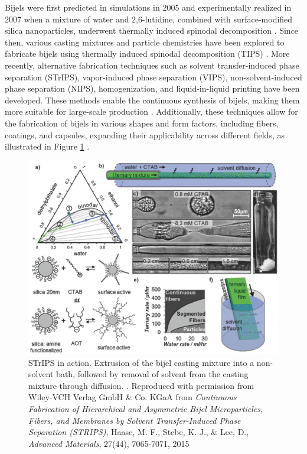 Bijels were first predicted in simulations in 2005 and experimentally realized in 2007 when a mixture of water and 2,6-lutidine, combined with 
surface-modified silica nanoparticles, underwent thermally induced spinodal decomposition \cite{stratford_colloidal_2005, herzig_bicontinuous_2007}. 
Since then, various casting mixtures and particle chemistries have been explored to fabricate bijels using thermally induced spinodal decomposition (TIPS) 
\cite{lee_bicontinuous_2010, bai_dynamics_2015}. More recently, alternative fabrication techniques such as solvent transfer-induced phase separation (STrIPS), 
vapor-induced phase separation (VIPS), non-solvent-induced phase separation (NIPS), homogenization, and liquid-in-liquid printing have been developed. 
These methods enable the continuous synthesis of bijels, making them more suitable for large-scale production 
\cite{haase_continuous_2015, wang_scalable_2020, cai_bijels_2017, yabuno_preparation_2020, wang_bicontinuous_2023, amirfattahi_fabrication_2024}. 
Additionally, these techniques allow for the fabrication of bijels in various shapes and form factors, including fibers, coatings, and capsules, expanding 
their applicability across different fields, as illustrated in Figure \ref{fig:strips} 
\cite{haase_continuous_2015, boakye-ansah_controlling_2020, kharal_hightensile_2020, wang_bicontinuous_2023}.  

\begin{figure}[h]
    \centering
    \includegraphics[scale = 5]{figures/introduction/STrIPS.jpg}
    \caption{STrIPS in action. Extrusion of the bijel casting mixture into a non-solvent bath, followed by removal of solvent from 
             the casting mixture through diffusion. \cite{haase_continuous_2015}. Reproduced with permission from Wiley-VCH Verlag GmbH 
             \& Co. KGaA from \textit{Continuous Fabrication of Hierarchical and Asymmetric Bijel Microparticles, Fibers, and Membranes by 
             Solvent Transfer-Induced Phase Separation (STRIPS)}, Haase, M. F., Stebe, K. J., 
             \& Lee, D., \textit{Advanced Materials}, 27(44), 7065-7071, 2015}
    \label{fig:strips}
\end{figure}

